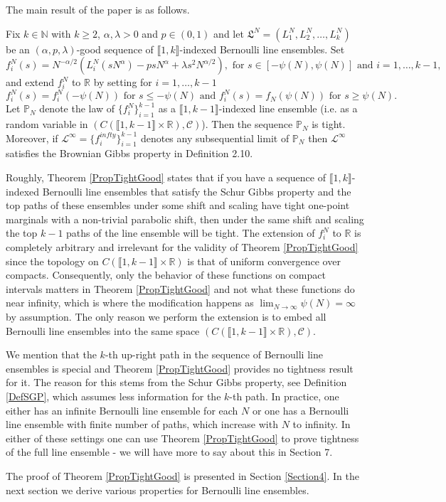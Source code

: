 The main result of the paper is as follows.
\begin{theorem}\label{PropTightGood}
Fix $k \in \mathbb{N}$ with $k \geq 2$, $\alpha, \lambda > 0$ and $p \in (0,1)$ and let $\mathfrak{L}^N = (L^N_1, L^N_2, \dots, L^N_k)$ be an $(\alpha, p, \lambda)$-good sequence of $\llbracket 1, k \rrbracket$-indexed Bernoulli line ensembles.  Set
$$f^N_i(s) =  N^{-\alpha/2}(L^N_i(sN^{\alpha}) - p s N^{\alpha} + \lambda s^2 N^{\alpha/2}), \mbox{ for $s\in [-\psi(N) ,\psi(N)]$ and $i = 1,\dots, k -1$,}$$
and extend $f^N_i$ to $\mathbb{R}$ by setting for $i = 1, \dots, k - 1$
$$f^N_i(s) = f^N_i(-\psi(N)) \mbox{ for $s \leq -\psi(N)$ and } f^N_i(s) = f_N(\psi(N)) \mbox{ for $s \geq \psi(N)$}.$$
Let $\mathbb{P}_N$ denote the law of $\{f^N_i\}_{i = 1}^{k-1}$ as a $\llbracket 1, k-1 \rrbracket$-indexed line ensemble (i.e. as a random variable in $(C( \llbracket 1, k -1 \rrbracket \times \mathbb{R}), \mathcal{C})$). Then the sequence $\mathbb{P}_N$ is tight. Moreover, if $\mathcal{L}^\infty = \{f_i^{infty}\}_{i = 1}^{k-1}$ denotes any subsequential limit of $\mathbb{P}_N$ then $\mathcal{L}^\infty$ satisfies the Brownian Gibbs property in Definition 2.10.
\end{theorem}

Roughly, Theorem \ref{PropTightGood} states that if you have a sequence of $\llbracket 1, k \rrbracket$-indexed Bernoulli line ensembles that satisfy the Schur Gibbs property and the top paths of these ensembles under some shift and scaling have tight one-point marginals with a non-trivial parabolic shift, then  under the same shift and scaling the top $k-1$ paths of the line ensemble will be tight. The extension of $f^N_i$ to $\mathbb{R}$ is completely arbitrary and irrelevant for the validity of Theorem \ref{PropTightGood} since the topology on $C( \llbracket 1, k -1 \rrbracket \times \mathbb{R})$ is that of uniform convergence over compacts. Consequently, only the behavior of these functions on compact intervals matters in Theorem \ref{PropTightGood} and not what these functions do near infinity, which is where the modification happens as $\lim_{N \rightarrow \infty} \psi(N) = \infty$  by assumption. The only reason we perform the extension is to embed all Bernoulli line ensembles into the same space $(C( \llbracket 1, k -1 \rrbracket \times \mathbb{R}), \mathcal{C})$.

 We mention that the $k$-th up-right path in the sequence of Bernoulli line ensembles is special and Theorem \ref{PropTightGood} provides no tightness result for it. The reason for this stems from the Schur Gibbs property, see Definition \ref{DefSGP}, which assumes less information for the $k$-th path. In practice, one either has an infinite Bernoulli line ensemble for each $N$ or one has a Bernoulli line ensemble with finite number of paths, which increase with $N$ to infinity. In either of these settings one can use Theorem \ref{PropTightGood} to prove tightness of the full line ensemble - we will have more to say about this in Section 7.

The proof of Theorem \ref{PropTightGood} is presented in Section \ref{Section4}. In the next section we derive various properties for Bernoulli line ensembles.







